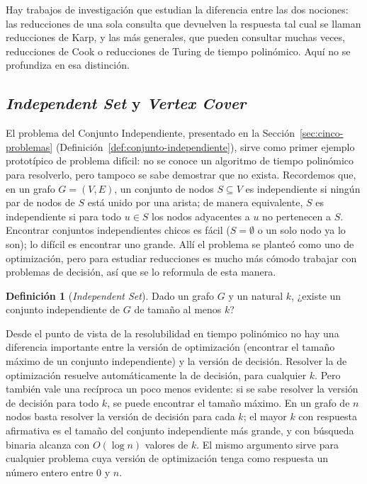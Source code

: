 \documentclass[12pt, spanish, oneside, openany]{book}
\newcommand{\prob}[1]{\textit{#1}}
\newcommand{\IS}{\prob{Independent Set}\xspace}
\theoremstyle{uprightplain}
\theoremstyle{definition}
\newtheorem{definicion}[teorema]{Definición}
\theoremstyle{remark}
\theoremstyle{definition}
\begin{document}
Hay trabajos de investigación que estudian la diferencia entre las dos nociones: las reducciones de una sola consulta que devuelven la respuesta tal cual se llaman reducciones de Karp, y las más generales, que pueden consultar muchas veces, reducciones de Cook o reducciones de Turing de tiempo polinómico. Aquí no se profundiza en esa distinción.

\subsection{\texorpdfstring{\prob{Independent Set} y \prob{Vertex Cover}}{Independent Set y Vertex Cover}}
\label{subsec:np-is-vc}

El problema del Conjunto Independiente, presentado en la Sección~\ref{sec:cinco-problemas} (Definición~\ref{def:conjunto-independiente}), sirve como primer ejemplo prototípico de problema difícil: no se conoce un algoritmo de tiempo polinómico para resolverlo, pero tampoco se sabe demostrar que no exista. Recordemos que, en un grafo $G=(V,E)$, un conjunto de nodos $S\subseteq V$ es independiente si ningún par de nodos de $S$ está unido por una arista; de manera equivalente, $S$ es independiente si para todo $u\in S$ los nodos adyacentes a $u$ no pertenecen a $S$. Encontrar conjuntos independientes chicos es fácil ($S=\emptyset$ o un solo nodo ya lo son); lo difícil es encontrar uno grande. Allí el problema se planteó como uno de optimización, pero para estudiar reducciones es mucho más cómodo trabajar con problemas de decisión, así que se lo reformula de esta manera.

\begin{definicion}[\IS]
\label{def:np-is}
Dado un grafo $G$ y un natural $k$, ¿existe un conjunto independiente de $G$ de tamaño al menos $k$?
\end{definicion}

Desde el punto de vista de la resolubilidad en tiempo polinómico no hay una diferencia importante entre la versión de optimización (encontrar el tamaño máximo de un conjunto independiente) y la versión de decisión. Resolver la de optimización resuelve automáticamente la de decisión, para cualquier $k$. Pero también vale una recíproca un poco menos evidente: si se sabe resolver la versión de decisión para todo $k$, se puede encontrar el tamaño máximo. En un grafo de $n$ nodos basta resolver la versión de decisión para cada $k$; el mayor $k$ con respuesta afirmativa es el tamaño del conjunto independiente más grande, y con búsqueda binaria alcanza con $O(\log n)$ valores de $k$. El mismo argumento sirve para cualquier problema cuya versión de optimización tenga como respuesta un número entero entre $0$ y $n$.
\end{document}
